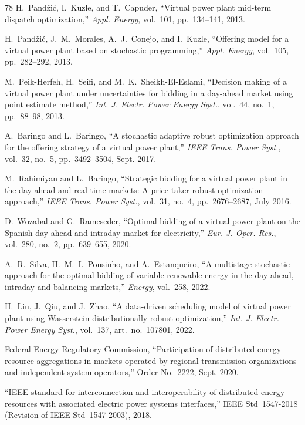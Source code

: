 \documentclass[journal]{IEEEtran}
\begin{document}
\begin{thebibliography}{78}
 H.~Pand\v{z}i\'{c}, I.~Kuzle, and T.~Capuder, ``Virtual power plant mid-term dispatch optimization,'' \textit{Appl. Energy}, vol.~101, pp.~134--141, 2013.

 H.~Pand\v{z}i\'{c}, J.~M.~Morales, A.~J.~Conejo, and I.~Kuzle, ``Offering model for a virtual power plant based on stochastic programming,'' \textit{Appl. Energy}, vol.~105, pp.~282--292, 2013.

 M.~Peik-Herfeh, H.~Seifi, and M.~K.~Sheikh-El-Eslami, ``Decision making of a virtual power plant under uncertainties for bidding in a day-ahead market using point estimate method,'' \textit{Int. J. Electr. Power Energy Syst.}, vol.~44, no.~1, pp.~88--98, 2013.

 A.~Baringo and L.~Baringo, ``A stochastic adaptive robust optimization approach for the offering strategy of a virtual power plant,'' \textit{IEEE Trans. Power Syst.}, vol.~32, no.~5, pp.~3492--3504, Sept. 2017.

 M.~Rahimiyan and L.~Baringo, ``Strategic bidding for a virtual power plant in the day-ahead and real-time markets: A price-taker robust optimization approach,'' \textit{IEEE Trans. Power Syst.}, vol.~31, no.~4, pp.~2676--2687, July 2016.

 D.~Wozabal and G.~Rameseder, ``Optimal bidding of a virtual power plant on the Spanish day-ahead and intraday market for electricity,'' \textit{Eur. J. Oper. Res.}, vol.~280, no.~2, pp.~639--655, 2020.

 A.~R.~Silva, H.~M.~I.~Pousinho, and A.~Estanqueiro, ``A multistage stochastic approach for the optimal bidding of variable renewable energy in the day-ahead, intraday and balancing markets,'' \textit{Energy}, vol.~258, 2022.

 H.~Liu, J.~Qiu, and J.~Zhao, ``A data-driven scheduling model of virtual power plant using Wasserstein distributionally robust optimization,'' \textit{Int. J. Electr. Power Energy Syst.}, vol.~137, art.~no.~107801, 2022.

 Federal Energy Regulatory Commission, ``Participation of distributed energy resource aggregations in markets operated by regional transmission organizations and independent system operators,'' Order No.~2222, Sept. 2020.

 ``IEEE standard for interconnection and interoperability of distributed energy resources with associated electric power systems interfaces,'' IEEE Std~1547-2018 (Revision of IEEE Std~1547-2003), 2018.


\end{thebibliography}
\end{document}
